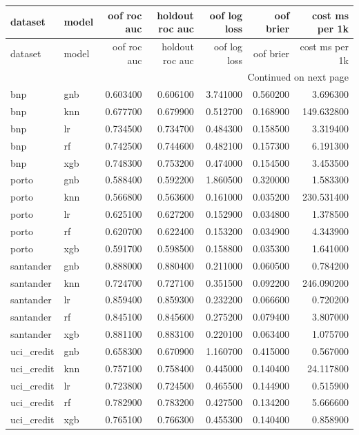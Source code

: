 \begin{center}\label{tab:s2model}\end{center}
\begingroup\scriptsize\setlength{\tabcolsep}{2.5pt}
\begin{longtable}{llrrrrr}
\toprule
dataset & model & oof roc auc & holdout roc auc & oof log loss & oof brier & cost ms per 1k \\
\midrule
\endfirsthead
\toprule
dataset & model & oof roc auc & holdout roc auc & oof log loss & oof brier & cost ms per 1k \\
\midrule
\endhead
\midrule
\multicolumn{7}{r}{Continued on next page} \\
\midrule
\endfoot
\bottomrule
\endlastfoot
bnp & gnb & 0.603400 & 0.606100 & 3.741000 & 0.560200 & 3.696300 \\
bnp & knn & 0.677700 & 0.679900 & 0.512700 & 0.168900 & 149.632800 \\
bnp & lr & 0.734500 & 0.734700 & 0.484300 & 0.158500 & 3.319400 \\
bnp & rf & 0.742500 & 0.744600 & 0.482100 & 0.157300 & 6.191300 \\
bnp & xgb & 0.748300 & 0.753200 & 0.474000 & 0.154500 & 3.453500 \\
porto & gnb & 0.588400 & 0.592200 & 1.860500 & 0.320000 & 1.583300 \\
porto & knn & 0.566800 & 0.563600 & 0.161000 & 0.035200 & 230.531400 \\
porto & lr & 0.625100 & 0.627200 & 0.152900 & 0.034800 & 1.378500 \\
porto & rf & 0.620700 & 0.622400 & 0.153200 & 0.034900 & 4.343900 \\
porto & xgb & 0.591700 & 0.598500 & 0.158800 & 0.035300 & 1.641000 \\
santander & gnb & 0.888000 & 0.880400 & 0.211000 & 0.060500 & 0.784200 \\
santander & knn & 0.724700 & 0.727100 & 0.351500 & 0.092200 & 246.090200 \\
santander & lr & 0.859400 & 0.859300 & 0.232200 & 0.066600 & 0.720200 \\
santander & rf & 0.845100 & 0.845600 & 0.275200 & 0.079400 & 3.807000 \\
santander & xgb & 0.881100 & 0.883100 & 0.220100 & 0.063400 & 1.075700 \\
uci\_credit & gnb & 0.658300 & 0.670900 & 1.160700 & 0.415000 & 0.567000 \\
uci\_credit & knn & 0.757100 & 0.758400 & 0.445000 & 0.140400 & 24.117800 \\
uci\_credit & lr & 0.723800 & 0.724500 & 0.465500 & 0.144900 & 0.515900 \\
uci\_credit & rf & 0.782900 & 0.783200 & 0.427500 & 0.134200 & 5.666600 \\
uci\_credit & xgb & 0.765100 & 0.766300 & 0.455300 & 0.140400 & 0.858900 \\
\end{longtable}\endgroup
